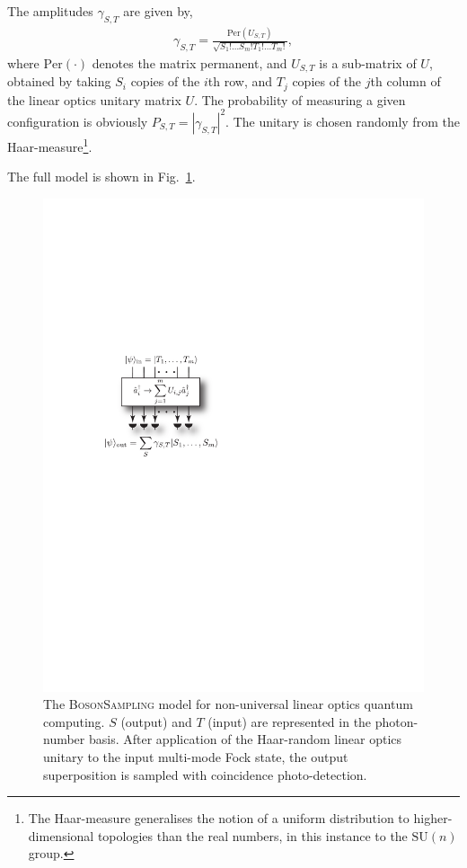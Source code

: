 \documentclass[aps,rmp,twocolumn,amsmath,amssymb,nofootinbib,superscriptaddress,longbibliography,floatfix,table-of-contents,eqsecnum]{revtex4-1}
\begin{document}
The amplitudes $\gamma_{S,T}$ are given by,
\begin{align}
\gamma_{S,T} = \frac{\text{Per}(U_{S,T})}{\sqrt{S_1!\dots S_m! T_1!\dots T_m!}},
\end{align}
where $\text{Per}(\cdot)$ denotes the matrix permanent, and $U_{S,T}$ is a sub-matrix of $U$, obtained by taking $S_i$ copies of the $i$th row, and $T_j$ copies of the $j$th column of the linear optics unitary matrix $U$. The probability of measuring a given configuration is obviously \mbox{$P_{S,T} = |\gamma_{S,T}|^2$}. The unitary is chosen randomly from the Haar-measure\footnote{The Haar-measure generalises the notion of a uniform distribution to higher-dimensional topologies than the real numbers, in this instance to the $\text{SU}(n)$ group.}.

The full model is shown in Fig.~\ref{fig:bs_model}.

\begin{figure}[!htb]
\includegraphics[width=0.7\columnwidth]{bs_model}
\caption{The \textsc{BosonSampling} model for non-universal linear optics quantum computing. $S$ (output) and $T$ (input) are represented in the photon-number basis. After application of the Haar-random linear optics unitary to the input multi-mode Fock state, the output superposition is sampled with coincidence photo-detection.} \label{fig:bs_model}
\end{figure}
\end{document}
